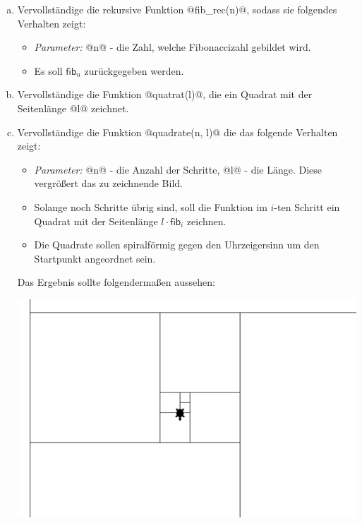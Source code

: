     \begin{enumerate}[(a)]
        \item 
        Vervollständige die rekursive Funktion @fib_rec(n)@, sodass sie folgendes Verhalten zeigt:
        \begin{itemize}
            \item 
            \textit{Parameter:} @n@ - die Zahl, welche Fibonaccizahl gebildet wird.
            \item 
            Es soll $\mathsf{fib}_n$ zurückgegeben werden.
        \end{itemize}

        \item 
        Vervollständige die Funktion @quatrat(l)@, die ein Quadrat mit der Seitenlänge @l@ zeichnet.
        
        \item
        Vervollständige die Funktion @quadrate(n, l)@ die das folgende Verhalten zeigt:
        \begin{itemize}
            \item 
            \textit{Parameter:} @n@ - die Anzahl der Schritte, @l@ - die Länge. Diese vergrößert das zu zeichnende Bild.
            \item
            Solange noch Schritte übrig sind, soll die Funktion im $i$-ten Schritt ein Quadrat mit der Seitenlänge $l\cdot\mathsf{fib}_i$ zeichnen.
            \item
            Die Quadrate sollen spiralförmig gegen den Uhrzeigersinn um den Startpunkt angeordnet sein.
        \end{itemize}

        Das Ergebnis sollte folgendermaßen aussehen:
        \begin{center}  
            \includegraphics[scale=0.35]{img/fib_squares}
        \end{center}
        

\end{enumerate}
